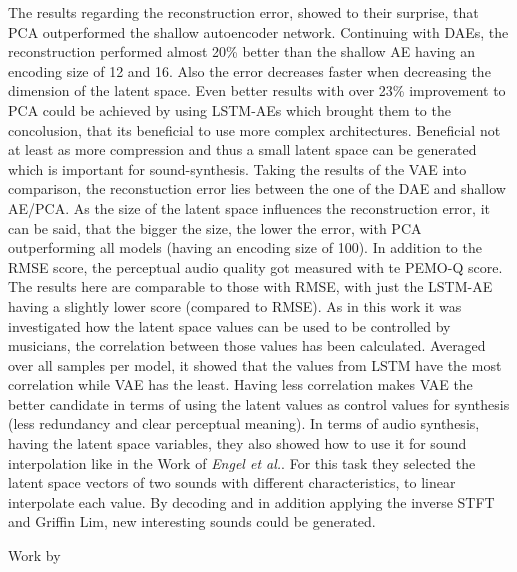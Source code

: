 The results regarding the reconstruction error, showed to their surprise, that PCA outperformed the shallow autoencoder network. Continuing with DAEs, the reconstruction performed almost 20\% better than the shallow AE having an encoding size of 12 and 16. Also the error decreases faster when decreasing the dimension of the latent space. Even better results with over 23\% improvement to PCA could be achieved by using LSTM-AEs which brought them to the concolusion, that its beneficial to use more complex architectures. Beneficial not at least as more compression and thus a small latent space can be generated which is important for sound-synthesis. Taking the results of the VAE into comparison, the reconstuction error lies between the one of the DAE and shallow AE/PCA. As the size of the latent space influences the reconstruction error, it can be said, that the bigger the size, the lower the error, with PCA outperforming all models (having an encoding size of 100). In addition to the RMSE score, the perceptual audio quality got measured with te PEMO-Q score. The results here are comparable to those with RMSE, with just the LSTM-AE having a slightly lower score (compared to RMSE). As in this work it was investigated how the latent space values can be used to be controlled by musicians, the correlation between those values has been calculated. Averaged over all samples per model, it showed that the values from LSTM have the most correlation while VAE has the least. Having less correlation makes VAE the better candidate in terms of using the latent values as control values for synthesis (less redundancy and clear perceptual meaning). In terms of audio synthesis, having the latent space variables, they also showed how to use it for sound interpolation like in the Work of \textit{Engel et al.}. For this task they selected the latent space vectors of two sounds with different characteristics, to linear interpolate each value. By decoding and in addition applying the inverse STFT and Griffin Lim, new interesting sounds could be generated. 




Work by \cite{hantrakul2019fast}

